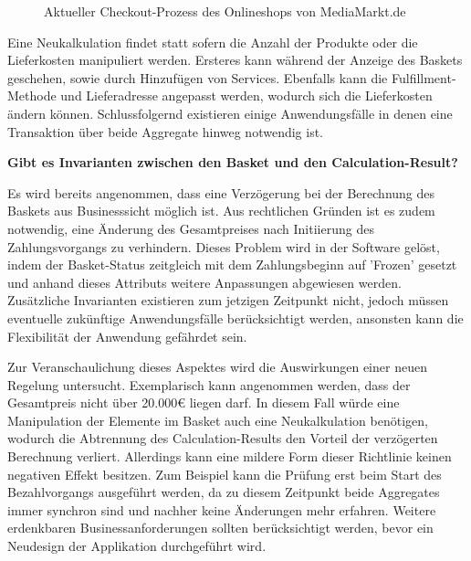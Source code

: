 \vspace{0.5cm}
\begin{figure}[htbp]
	\centering
	\caption{Aktueller Checkout-Prozess des Onlineshops von MediaMarkt.de}
	\label{fig:Checkout-Process}
\end{figure}

Eine Neukalkulation findet statt sofern die Anzahl der Produkte oder die Lieferkosten manipuliert werden. Ersteres kann während der Anzeige des Baskets geschehen, sowie durch Hinzufügen von Services. Ebenfalls kann die Fulfillment-Methode und Lieferadresse angepasst werden, wodurch sich die Lieferkosten ändern können. Schlussfolgernd existieren einige Anwendungsfälle in denen eine Transaktion über beide Aggregate hinweg notwendig ist.

\textbf{Gibt es Invarianten zwischen den Basket und den Calculation-Result?}

Es wird bereits angenommen, dass eine Verzögerung bei der Berechnung des Baskets aus Businesssicht möglich ist. Aus rechtlichen Gründen ist es zudem notwendig, eine Änderung des Gesamtpreises nach Initiierung des Zahlungsvorgangs zu verhindern. Dieses Problem wird in der Software gelöst, indem der Basket-Status zeitgleich mit dem Zahlungsbeginn auf 'Frozen' gesetzt und anhand dieses Attributs weitere Anpassungen abgewiesen werden. Zusätzliche Invarianten existieren zum jetzigen Zeitpunkt nicht, jedoch müssen eventuelle zukünftige Anwendungsfälle berücksichtigt werden, ansonsten kann die Flexibilität der Anwendung gefährdet sein. 

Zur Veranschaulichung dieses Aspektes wird die Auswirkungen einer neuen Regelung untersucht. Exemplarisch kann angenommen werden, dass der Gesamtpreis nicht über 20.000€ liegen darf. In diesem Fall würde eine Manipulation der Elemente im Basket auch eine Neukalkulation benötigen, wodurch die Abtrennung des Calculation-Results den Vorteil der verzögerten Berechnung verliert. Allerdings kann eine mildere Form dieser Richtlinie keinen negativen Effekt besitzen. Zum Beispiel kann die Prüfung erst beim Start des Bezahlvorgangs ausgeführt werden, da zu diesem Zeitpunkt beide Aggregates immer synchron sind und nachher keine Änderungen mehr erfahren. Weitere erdenkbaren Businessanforderungen sollten berücksichtigt werden, bevor ein Neudesign der Applikation durchgeführt wird.

